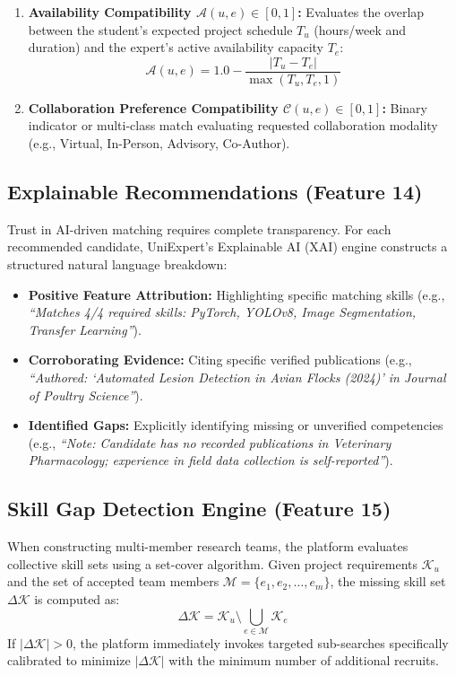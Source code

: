 \documentclass[11pt,a4paper]{article}
\begin{document}
\begin{enumerate}[label=\textbf{\arabic*.}]
    \item \textbf{Availability Compatibility $\mathcal{A}(u, e) \in [0, 1]$:} Evaluates the overlap between the student's expected project schedule $T_u$ (hours/week and duration) and the expert's active availability capacity $T_e$:
    \begin{equation}
        \mathcal{A}(u, e) = 1.0 - \frac{|T_u - T_e|}{\max(T_u, T_e, 1)}
    \end{equation}

    \item \textbf{Collaboration Preference Compatibility $\mathcal{C}(u, e) \in [0, 1]$:} Binary indicator or multi-class match evaluating requested collaboration modality (e.g., Virtual, In-Person, Advisory, Co-Author).
\end{enumerate}

\subsection{Explainable Recommendations (Feature 14)}
Trust in AI-driven matching requires complete transparency. For each recommended candidate, UniExpert's Explainable AI (XAI) engine constructs a structured natural language breakdown:
\begin{itemize}
    \item \textbf{Positive Feature Attribution:} Highlighting specific matching skills (e.g., \textit{``Matches 4/4 required skills: PyTorch, YOLOv8, Image Segmentation, Transfer Learning''}).
    \item \textbf{Corroborating Evidence:} Citing specific verified publications (e.g., \textit{``Authored: `Automated Lesion Detection in Avian Flocks (2024)' in Journal of Poultry Science''}).
    \item \textbf{Identified Gaps:} Explicitly identifying missing or unverified competencies (e.g., \textit{``Note: Candidate has no recorded publications in Veterinary Pharmacology; experience in field data collection is self-reported''}).
\end{itemize}

\subsection{Skill Gap Detection Engine (Feature 15)}
When constructing multi-member research teams, the platform evaluates collective skill sets using a set-cover algorithm. Given project requirements $\mathcal{K}_u$ and the set of accepted team members $\mathcal{M} = \{e_1, e_2, \dots, e_m\}$, the missing skill set $\Delta \mathcal{K}$ is computed as:
\begin{equation}
    \label{eq:team_skill_gap}
    \Delta \mathcal{K} = \mathcal{K}_u \setminus \bigcup_{e \in \mathcal{M}} \mathcal{K}_e
\end{equation}
If $|\Delta \mathcal{K}| > 0$, the platform immediately invokes targeted sub-searches specifically calibrated to minimize $|\Delta \mathcal{K}|$ with the minimum number of additional recruits.
\end{document}
